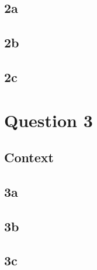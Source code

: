 \documentclass[a4paper, 12pt, titlepage]{report}
\begin{document}
\section{2a}
\section{2b}
\section{2c}
\chapter{Question 3}
\section{Context}
\section{3a}
\section{3b}
\section{3c}

\printbibliography
\end{document}
